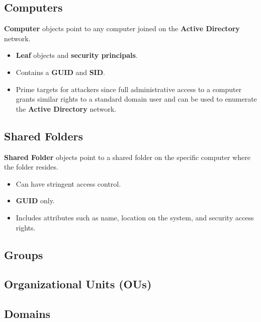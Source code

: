 \documentclass[12pt, letterpaper]{article}
\begin{document}
\subsection*{Computers}

\textbf{Computer} objects point to any computer joined on the \textbf{Active Directory} network.

\begin{itemize}
    \item \textbf{Leaf} objects and \textbf{security principals}.
    \item Contains a \textbf{GUID} and \textbf{SID}.
    \item Prime targets for attackers since full administrative access to a computer grants similar rights to a standard domain user and can be used to enumerate the \textbf{Active Directory} network.
\end{itemize}

\subsection*{Shared Folders}

\textbf{Shared Folder} objects point to a shared folder on the specific computer where the folder resides.

\begin{itemize}
    \item Can have stringent access control.
    \item \textbf{GUID} only.
    \item Includes attributes such as name, location on the system, and security access rights.
\end{itemize}

\subsection*{Groups}


\subsection*{Organizational Units (OUs)}


\subsection*{Domains}

\end{document}
